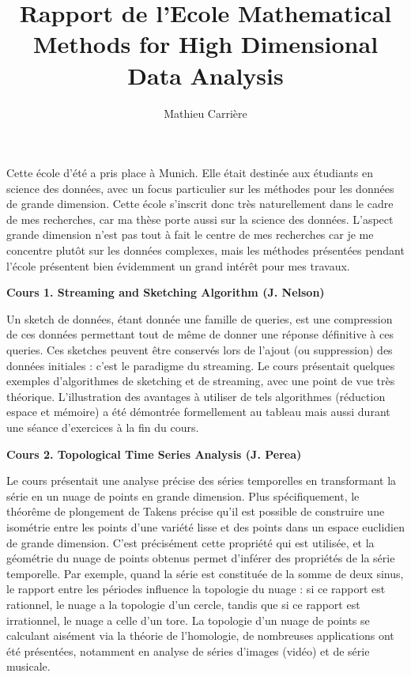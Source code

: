 \documentclass[a4paper, 11pt]{article}
\begin{document}
 
\title{Rapport de l'Ecole Mathematical Methods for High Dimensional Data Analysis}
\author{Mathieu Carri\`ere}
\date{}

\maketitle

Cette école d'été a pris place à Munich. Elle était destinée aux étudiants en science 
des données, avec un focus particulier sur les méthodes pour les données de grande dimension.
Cette école s'inscrit donc très naturellement dans le cadre de mes recherches, car ma thèse porte
aussi sur la science des données. L'aspect grande dimension n'est pas tout à fait le centre de 
mes recherches car je me concentre plutôt sur les données complexes, mais les méthodes présentées
pendant l'école présentent bien évidemment un grand intérêt pour mes travaux.

\begin{center} \textbf{Cours 1. Streaming and Sketching Algorithm (J. Nelson)} \end{center}

Un sketch de données, étant donnée une famille de queries, est une compression de
ces données permettant tout de même de donner une réponse définitive à ces queries.
Ces sketches peuvent être conservés lors de l'ajout (ou suppression) des données initiales :
c'est le paradigme du streaming. Le cours présentait quelques exemples d'algorithmes de
sketching et de streaming, avec une point de vue très théorique. L'illustration des avantages
à utiliser de tels algorithmes (réduction espace et mémoire) a été démontrée formellement
au tableau mais aussi durant une séance d'exercices à la fin du cours.

\begin{center} \textbf{Cours 2. Topological Time Series Analysis (J. Perea)} \end{center}

Le cours présentait une analyse précise des séries temporelles en transformant la série en un nuage
de points en grande dimension. Plus spécifiquement, le théorême de plongement de Takens précise
qu'il est possible de construire une isométrie entre les points d'une variété lisse et des points
dans un espace euclidien de grande dimension. C'est précisément cette propriété qui est utilisée, 
et la géométrie du nuage de points obtenus permet d'inférer des propriétés de la série temporelle.
Par exemple, quand la série est constituée de la somme de deux sinus, le rapport entre les périodes
influence la topologie du nuage : si ce rapport est rationnel, le nuage a la topologie d'un cercle,
tandis que si ce rapport est irrationnel, le nuage a celle d'un tore. 
La topologie d'un nuage de points se calculant aisément via la théorie de l'homologie, 
de nombreuses applications ont été
présentées, notamment en analyse de séries d'images (vidéo) et de série musicale.
\end{document}
